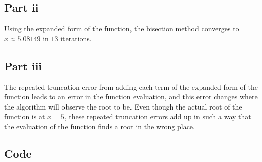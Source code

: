 \documentclass[12pt]{exam}
\begin{document}
\subsection*{Part ii}
Using the expanded form of the function, the bisection method converges to $x\approx 5.08149$ in $13$ iterations. 
\subsection*{Part iii}
The repeated truncation error from adding each term of the expanded form of the function leads to an error in the function evaluation, and this error changes where the algorithm will observe the root to be. Even though the actual root of the function is at $x=5$, these repeated truncation errors add up in such a way that the evaluation of the function finds a root in the wrong place. 
\subsection*{Code}


\end{document}
